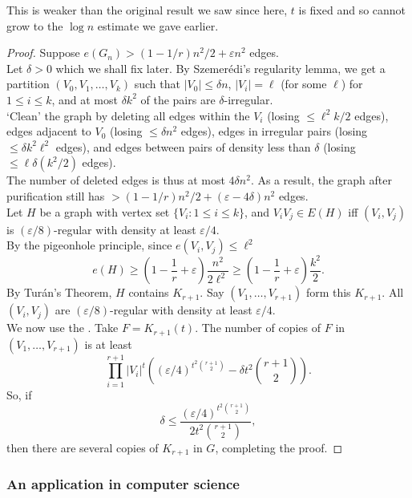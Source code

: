 			This is weaker than the original result we saw since here, $t$ is fixed and so cannot grow to the $\log n$ estimate we gave earlier.

			\begin{proof}
				Suppose $e(G_n) > (1 - 1/r) n^2/2 + \varepsilon n^2$ edges.\\
				Let $\delta>0$ which we shall fix later. By Szemer\'{e}di's regularity lemma, we get a partition $(V_0,V_1,\ldots,V_k)$ such that $|V_0| \le \delta n$, $|V_i| = \ell$ (for some $\ell$) for $1\le i\le k$, and at most $\delta k^2$ of the pairs are $\delta$-irregular.\\
				`Clean' the graph by deleting all edges within the $V_i$ (losing $\le \ell^2k/2$ edges), edges adjacent to $V_0$ (losing $\le \delta n^2$ edges), edges in irregular pairs (losing $\le \delta k^2\ell^2$ edges), and edges between pairs of density less than $\delta$ (losing $\le \ell\delta (k^2/2)$ edges).\\
				The number of deleted edges is thus at most $4\delta n^2$. As a result, the graph after purification still has $>(1-1/r)n^2/2 + (\varepsilon - 4\delta)n^2$ edges. \\

				Let $H$ be a graph with vertex set $\{V_i : 1 \le i \le k\}$, and $V_i V_j \in E(H)$ iff $(V_i,V_j)$ is $(\varepsilon/8)$-regular with density at least $\varepsilon/4$.\\
				By the pigeonhole principle, since $e(V_i,V_j) \le \ell^2$
				\[ e(H) \ge \left( 1 - \frac{1}{r} + \varepsilon \right) \frac{n^2}{2\ell^2} \ge \left( 1 - \frac{1}{r} + \varepsilon \right) \frac{k^2}{2} . \]
				By Tur\'{a}n's Theorem, $H$ contains $K_{r+1}$. Say $(V_1,\ldots,V_{r+1})$ form this $K_{r+1}$. All $(V_i,V_j)$ are $(\varepsilon/8)$-regular with density at least $\varepsilon/4$.\\
				We now use the . Take $F = K_{r+1}(t)$. The number of copies of $F$ in $(V_1,\ldots,V_{r+1})$ is at least
				\[ \prod_{i=1}^{r+1} |V_i|^t \left((\varepsilon/4)^{t^2\binom{r+1}{2}} - \delta t^2 \binom{r+1}{2}\right). \]
				So, if
				\[ \delta \le \frac{(\varepsilon/4)^{t^2\binom{r+1}{2}}}{2t^2\binom{r+1}{2}},  \]
				then there are several copies of $K_{r+1}$ in $G$, completing the proof.
			\end{proof}

		\subsubsection{An application in computer science}

